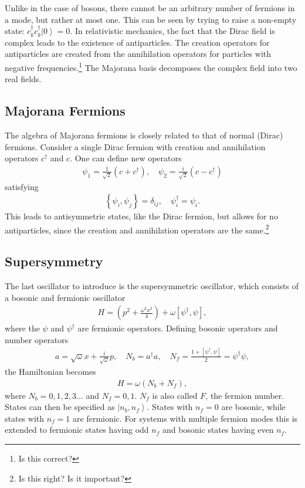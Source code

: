 \documentclass[12pt]{article} %
\renewcommand{\th}[1]{\frac{1}{#1}}
\newcommand{\om}{\omega}
\newcommand{\ket}[1]{\left|#1\right\rangle}
\newcommand{\comm}[2]{\left[#1,#2\right]}
\newcommand{\acom}[2]{\left\{#1,#2\right\}}
\begin{document}
Unlike in the case of bosons, there cannot be an arbitrary number of fermions in a mode, but rather at most one. This can be seen by trying to raise a non-empty state: $c_k^\dag c^\dag_k\ket{0} = 0$. In relativistic mechanics, the fact that the Dirac field is complex leads to the existence of antiparticles. The creation operators for antiparticles are created from the annihilation operators for particles with negative frequencies.\footnote{Is this correct?} The Majorana basis decomposes the complex field into two real fields.

\subsection{Majorana Fermions} \emph{} \label{sub:majorana}

The algebra of Majorana fermions is closely related to that of normal (Dirac) fermions. Consider a single Dirac fermion with creation and annihilation operators $c^\dag$ and $c$. One can define new operators
\begin{align}
\psi_1 = \th{\sqrt{2}}(c+c^\dag ),\quad \psi_2 = \frac{i}{\sqrt{2}}(c-c^\dag)
\end{align}
satisfying
\begin{align}
\acom{\psi_i}{\psi_j} = \delta_{ij},\quad \psi_i^\dag=\psi_i.
\end{align}
This leads to antisymmetric states, like the Dirac fermion, but allows for no antiparticles, since the creation and annihilation operators are the same.\footnote{Is this right? Is it important?} 

\subsection{Supersymmetry} \emph{} \label{sub:susy}

The last oscillator to introduce is the supersymmetric oscillator, which consists of a bosonic and fermionic oscillator
\begin{align}
H = \left(p^2+\frac{\om^2 x^2}{4}\right) + \om\left[\psi^\dag, \psi\right],
\end{align}
where the $\psi$ and $\psi^\dag$ are fermionic operators. Defining bosonic operators and number operators
\begin{align}
a = \sqrt{\om}x+\frac{i}{\sqrt{\om}}p,\quad N_b = a^\dag a,\quad N_f = \frac{1+\comm{\psi^\dag}{ \psi}}{2} = \psi^\dag \psi,
\end{align}
the Hamiltonian becomes
\begin{align}
H = \om \left(N_b + N_f\right),
\end{align}
where $N_b = 0,1,2,3...$ and $N_f = 0,1$. $N_f$ is also called $F$, the fermion number. States can then be specified as $\ket{n_b,n_f}$. States with $n_f=0$ are bosonic, while states with $n_f=1$ are fermionic. For systems with multiple fermion modes this is extended to fermionic states having odd $n_f$ and bosonic states having even $n_f$.
 
\end{document}
